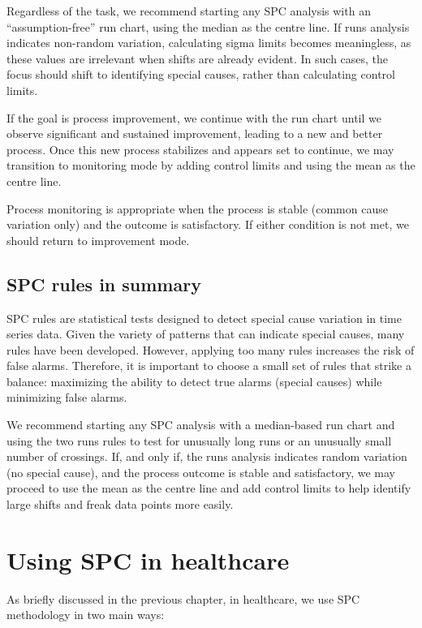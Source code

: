 \documentclass[
]{book}
\begin{document}
Regardless of the task, we recommend starting any SPC analysis with an ``assumption-free'' run chart, using the median as the centre line. If runs analysis indicates non-random variation, calculating sigma limits becomes meaningless, as these values are irrelevant when shifts are already evident. In such cases, the focus should shift to identifying special causes, rather than calculating control limits.

If the goal is process improvement, we continue with the run chart until we observe significant and sustained improvement, leading to a new and better process. Once this new process stabilizes and appears set to continue, we may transition to monitoring mode by adding control limits and using the mean as the centre line.

Process monitoring is appropriate when the process is stable (common cause variation only) and the outcome is satisfactory. If either condition is not met, we should return to improvement mode.

\section{SPC rules in summary}\label{spc-rules-in-summary}

SPC rules are statistical tests designed to detect special cause variation in time series data. Given the variety of patterns that can indicate special causes, many rules have been developed. However, applying too many rules increases the risk of false alarms. Therefore, it is important to choose a small set of rules that strike a balance: maximizing the ability to detect true alarms (special causes) while minimizing false alarms.

We recommend starting any SPC analysis with a median-based run chart and using the two runs rules to test for unusually long runs or an unusually small number of crossings. If, and only if, the runs analysis indicates random variation (no special cause), and the process outcome is stable and satisfactory, we may proceed to use the mean as the centre line and add control limits to help identify large shifts and freak data points more easily.

\chapter{Using SPC in healthcare}\label{using}

As briefly discussed in the previous chapter, in healthcare, we use SPC methodology in two main ways:
\end{document}
